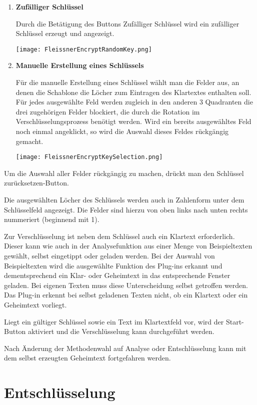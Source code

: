 \documentclass[fontsize=12pt, DIV=15, parskip=half-]{scrartcl}
\theoremstyle{break}
\begin{document}
\begin{enumerate}[label=(\alph*), leftmargin=*]
\item \textbf{Zufälliger Schlüssel}

Durch die Betätigung des Buttons \glqq Zufälliger Schlüssel\grqq{} wird ein zufälliger Schlüssel erzeugt und angezeigt. 

\texttt{[image: FleissnerEncryptRandomKey.png]}

\item \textbf{Manuelle Erstellung eines Schlüssels}

Für die manuelle Erstellung eines Schlüssel wählt man die Felder aus, an denen die Schablone die Löcher zum Eintragen des Klartextes enthalten soll. Für jedes ausgewählte Feld werden zugleich in den anderen 3 Quadranten die drei zugehörigen Felder blockiert, die durch die Rotation im Verschlüsselungsprozess benötigt werden. Wird ein bereits ausgewähltes Feld noch einmal angeklickt, so wird die Auswahl dieses Feldes rückgängig gemacht. 

\texttt{[image: FleissnerEncryptKeySelection.png]}
\end{enumerate} 

Um die Auswahl aller Felder rückgängig zu machen, drückt man den \glqq Schlüssel zurücksetzen\grqq -Button.

Die ausgewählten Löcher des Schlüssels werden auch in Zahlenform unter dem Schlüsselfeld angezeigt. Die Felder sind hierzu von oben links nach unten rechts nummeriert (beginnend mit 1).


Zur Verschlüsselung ist neben dem Schlüssel auch ein Klartext erforderlich. Dieser kann wie auch in der Analysefunktion aus einer Menge von Beispieltexten gewählt, selbst eingetippt oder geladen werden. Bei der Auswahl von Beispieltexten wird die ausgewählte Funktion des Plug-ins erkannt und dementsprechend ein Klar- oder Geheimtext in das entsprechende Fenster geladen. Bei eigenen Texten muss diese Unterscheidung selbst getroffen werden. Das Plug-in erkennt bei selbst geladenen Texten nicht, ob ein Klartext oder ein Geheimtext vorliegt.

Liegt ein gültiger Schlüssel sowie ein Text im Klartextfeld vor, wird der \glqq Start\grqq -Button aktiviert und die Verschlüsselung kann durchgeführt werden. 

Nach Änderung der Methodenwahl auf \glqq Analyse\grqq{} oder \glqq Entschlüsselung\grqq{} kann mit dem selbst erzeugten Geheimtext fortgefahren werden.

\section{Entschlüsselung}\hypertarget{entschl}{}
\end{document}
